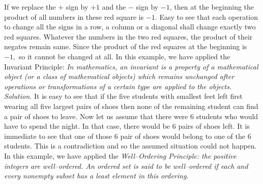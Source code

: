 \begin{multicols}{2}
\begin{center}
	\end{center}	
	If we replace the $+$ sign by $+1$ and the $-$ sign by $-1$, then at the beginning the product of all numbers in these red square is $-1.$ 
	Easy to see that each operation to change all the signs in a row, a column or a diagonal shall change exactly two red squares.
	Whatever the numbers in the two red squares, the product of their negates remain same.
	Since the product of the red squares at the beginning is $-1,$ so it cannot be changed at all.
	\vskip 0.1cm
	In this example, we have applied the Invariant Principle: \textit{In mathematics, an invariant is a property of a mathematical object
		(or a class of mathematical objects) which remains unchanged after operations or transformations of a certain type are applied to the objects.} 
	\vskip 0.2cm
	\vskip 0.2cm
	\textit{Solution.}
	It is easy to see that if the five students with smallest feet left first wearing all five largest pairs of shoes
	then none of the remaining student can find a pair of shoes to leave.
	Now let us assume that there were $6$ students who would have to spend the night. In that case, there would be $6$ pairs of shoes left. It is immediate to see that one of those $6$ pair of shoes would belong to one of the $6$ students. This is a contradiction and so the assumed situation could not happen.
	\vskip 0.1cm
	In this example, we have applied the \textit{Well--Ordering Principle: the positive integers are well--ordered.
		An ordered set is said to be well--ordered if each and every nonempty subset has a least element in this ordering.} 

\end{multicols}
